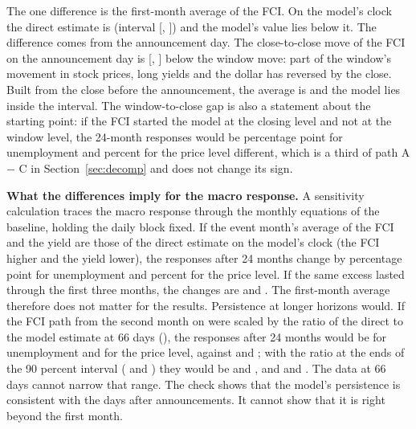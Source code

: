 \documentclass[11pt]{article}
\begin{document}
\begin{appendices}
The one difference is the first-month average of the FCI. On the model's clock the direct estimate is  (interval [, ]) and the model's value  lies below it. The difference comes from the announcement day. The close-to-close move of the FCI on the announcement day is  [, ] below the window move: part of the window's movement in stock prices, long yields and the dollar has reversed by the close. Built from the close before the announcement, the average is  and the model lies inside the interval. The window-to-close gap is also a statement about the starting point: if the FCI started the model at the closing level and not at the window level, the 24-month responses would be  percentage point for unemployment and  percent for the price level different, which is a third of path A $-$ C in Section~\ref{sec:decomp} and does not change its sign.

\textbf{What the differences imply for the macro response.} A sensitivity calculation traces the macro response through the monthly equations of the baseline, holding the daily block fixed. If the event month's average of the FCI and the yield are those of the direct estimate on the model's clock (the FCI  higher and the yield  lower), the responses after 24 months change by  percentage point for unemployment and  percent for the price level. If the same excess lasted through the first three months, the changes are  and . The first-month average therefore does not matter for the results. Persistence at longer horizons would. If the FCI path from the second month on were scaled by the ratio of the direct to the model estimate at 66 days (), the responses after 24 months would be  for unemployment and  for the price level, against  and ; with the ratio at the ends of the 90 percent interval ( and ) they would be  and , and  and . The data at 66 days cannot narrow that range. The check shows that the model's persistence is consistent with the days after announcements. It cannot show that it is right beyond the first month.







\end{appendices}
\end{document}
